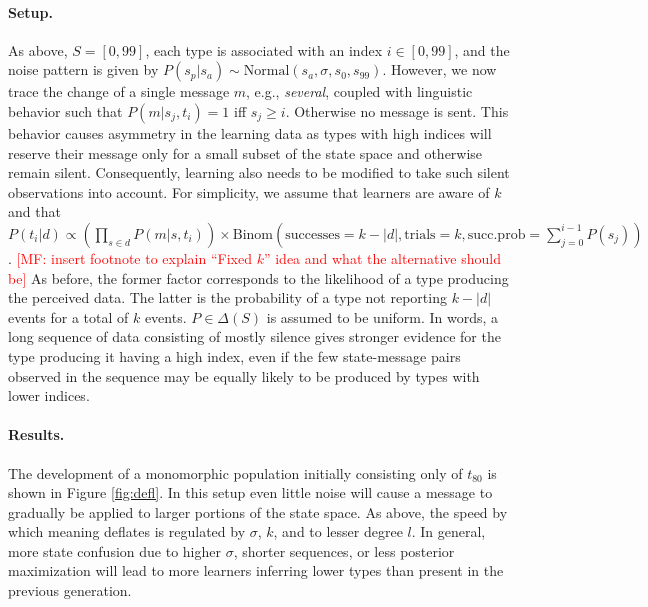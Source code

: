 \documentclass[10pt,a4paper]{article}
\newcommand{\mf}[1]{\textcolor{Red}{[MF: #1]}}
\begin{document}
\paragraph{Setup.} As above, $S = [0,99]$, each type is associated with an index $i \in [0,99]$,
and the noise pattern is given by $P(s_p|s_a) \sim \text{Normal}(s_{a},\sigma,s_{0},s_{99})$. However, we
now trace the change of a single message $m$, e.g., {\em several}, coupled with linguistic behavior such that
$P(m|s_j,t_i) = 1$ iff $s_j \geq i$. Otherwise no message is sent. This behavior
causes asymmetry in the learning data as types with high indices will reserve their message
only for a small subset of the state space and otherwise remain silent. Consequently, learning
also needs to be modified to take such silent observations into account. For simplicity, we
assume that learners are aware of $k$ and that
$P(t_i | d) \propto (\prod_{s \in d} P(m|s,t_i)) \times \text{Binom}(\text{successes} =
k-|d|, \text{trials} = k, \text{succ.prob} = \sum_{j=0}^{i-1} P(s_j))$. \mf{insert
  footnote to explain ``Fixed $k$'' idea and what the alternative should be}
As before, the former factor corresponds to the likelihood of a type producing the perceived 
data.  The latter is the probability of a type not reporting $k-|d|$ events for a
total of $k$ events. $P \in \Delta(S)$ is assumed to be uniform. In words, a long sequence of
data consisting of mostly silence gives stronger evidence for the type producing it having a
high index, even if the few state-message pairs observed in the sequence may be equally
likely to be produced by types with lower indices.

\paragraph{Results.} The development of a monomorphic population initially consisting only of $t_{80}$ is shown in Figure \ref{fig:defl}. In this setup even little noise will cause a message to gradually be applied to larger portions of the state space. As above, the speed by which meaning deflates is regulated by $\sigma$, $k$, and to lesser degree $l$. In general, more state confusion due to higher $\sigma$, shorter sequences, or less posterior maximization will lead to more learners inferring lower types than present in the previous generation. 
\end{document}
